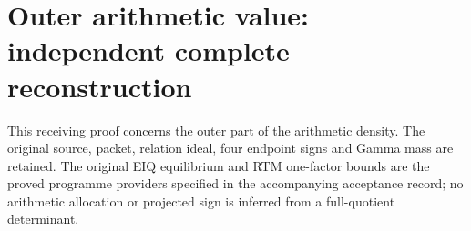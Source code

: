 \documentclass[11pt,a4paper]{article}
\begin{document}

\endgroup

\clearpage
\begingroup
\def\PP{\mathcal P}
\def\MM{\mathfrak M}
\def\BB{\mathcal B}

\setcounter{equation}{0}
\renewcommand{\theequation}{OR.\arabic{equation}}
\section*{Outer arithmetic value: independent complete reconstruction}



This receiving proof concerns the outer part of the arithmetic density.
The original source, packet, relation ideal, four endpoint signs and
Gamma mass are retained.  The original EIQ equilibrium and RTM
one-factor bounds are the proved programme providers specified in the
accompanying acceptance record; no arithmetic allocation or projected
sign is inferred from a full-quotient determinant.
\end{document}
